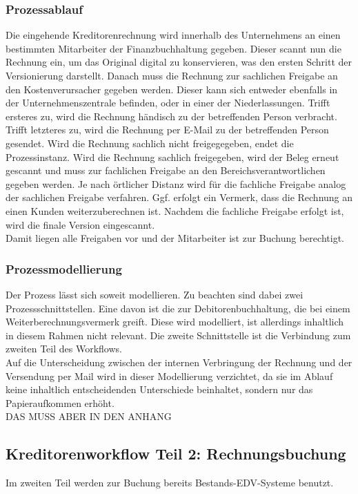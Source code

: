 \subsubsection{Prozessablauf}
Die eingehende Kreditorenrechnung wird innerhalb des Unternehmens an einen bestimmten Mitarbeiter der Finanzbuchhaltung gegeben.
Dieser scannt nun die Rechnung ein, um das Original digital zu konservieren, was den ersten Schritt der Versionierung darstellt.
Danach muss die Rechnung zur sachlichen Freigabe an den Kostenverursacher gegeben werden. 
Dieser kann sich entweder ebenfalls in der Unternehmenszentrale befinden, oder in einer der Niederlassungen.
Trifft ersteres zu, wird die Rechnung händisch zu der betreffenden Person verbracht. 
Trifft letzteres zu, wird die Rechnung per E-Mail zu der betreffenden Person gesendet.
Wird die Rechnung sachlich nicht freigegegeben, endet die Prozessinstanz.
Wird die Rechnung sachlich freigegeben, wird der Beleg erneut gescannt und muss zur fachlichen Freigabe an den Bereichsverantwortlichen gegeben werden.
Je nach örtlicher Distanz wird für die fachliche Freigabe analog der sachlichen Freigabe verfahren.
Ggf. erfolgt ein Vermerk, dass die Rechnung an einen Kunden weiterzuberechnen ist.
Nachdem die fachliche Freigabe erfolgt ist, wird die finale Version eingescannt.\\
Damit liegen alle Freigaben vor und der Mitarbeiter ist zur Buchung berechtigt.
\subsubsection{Prozessmodellierung}
Der Prozess lässt sich soweit modellieren.
Zu beachten sind dabei zwei Prozessschnittstellen. 
Eine davon ist die zur Debitorenbuchhaltung, die bei einem Weiterberechnungsvermerk greift. 
Diese wird modelliert, ist allerdings inhaltlich in diesem Rahmen nicht relevant.
Die zweite Schnittstelle ist die Verbindung zum zweiten Teil des Workflows.\\
Auf die Unterscheidung zwischen der internen Verbringung der Rechnung und der Versendung per Mail wird in dieser Modellierung verzichtet, da sie im Ablauf keine inhaltlich entscheidenden Unterschiede beinhaltet, sondern nur das Papieraufkommen erhöht.
\\
DAS MUSS ABER IN DEN ANHANG


\subsection{Kreditorenworkflow Teil 2: Rechnungsbuchung}
Im zweiten Teil werden zur Buchung bereits Bestands-EDV-Systeme benutzt.
